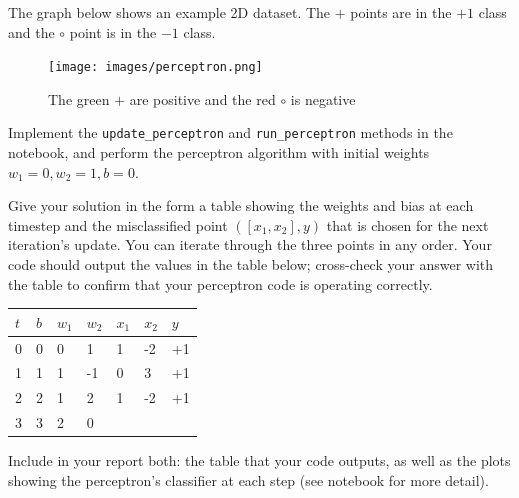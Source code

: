 \begin{problem}[8]
  The graph below shows an example 2D dataset. The $+$ points are in the $+1$ class and the $\circ$ point is in the $-1$ class. 

  \begin{figure}[H]
    \centering
    \texttt{[image: images/perceptron.png]}
    \caption{The green $+$ are positive and the red $\circ$ is negative}
    \label{fig:figure1}
  \end{figure}
  
 Implement the \texttt{update_perceptron} and \texttt{run_perceptron} methods in the notebook, and perform the perceptron algorithm with initial weights $w_1 = 0, w_2 = 1, b = 0$.

  Give your solution in the form a table showing the weights and bias at each timestep and the misclassified point $([x_1,x_2],y)$ that is chosen for the next iteration's update. You can iterate through the three points in any order. Your code should output the values in the table below; cross-check your answer with the table to confirm that your perceptron code is operating correctly.

  \begin{table}[H]
    \centering

    \begin{tabular}{l|lll|ll|l}
    \hline

    \hline
    $t$ & $b$ & $w_1$ & $w_2$ & $x_1$ & $x_2$ & $y$ \\
    \hline
      0  &  0 & 0 & 1  & 1 & -2 & +1\\
      1  &  1 & 1 & -1 & 0 & 3 & +1\\
      2  &  2 & 1 & 2 & 1 & -2 & +1\\
      3  &  3 & 2 & 0 \\
    \hline
    \end{tabular}
  \end{table}
  
  Include in your report both: the table that your code outputs, as well as the plots showing the perceptron's classifier at each step (see notebook for more detail).
  
  
\end{problem}

\newpage


